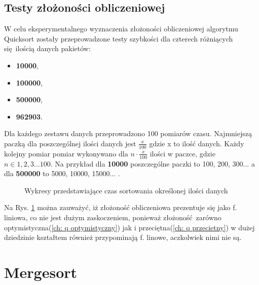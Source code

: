 \documentclass[12pt]{article}
\begin{document}
\subsection{Testy złożoności obliczeniowej}
W celu eksperymentalnego wyznaczenia złożoności obliczeniowej algorytmu Quicksort zostały przeprowadzone testy szybkości dla 
czterech różniących się ilością danych pakietów: 
\begin{itemize}
       \item \textbf{10000},
       \item  \textbf{100000},
       \item \textbf{500000},
       \item \textbf{962903}.
\end{itemize}
Dla każdego zestawu danych przeprowadzono 100 pomiarów czasu. Najmniejszą paczką dla poszczególnej ilości danych jest 
$\frac{x}{100}$ gdzie x to ilość danych. Każdy kolejny pomiar pomiar wykonywano dla $n \cdot \frac{x}{100}$ ilości w paczce,
gdzie $n \in 1,2,3 ... 100$.
Na przykład dla \textbf{10000} poszczególne paczki to 100, 200, 300... a dla \textbf{500000} to 5000, 10000, 15000... .

\begin{figure}[H]
       \centering
       \quad
\end{figure}
\begin{figure}[H]\ContinuedFloat
       \centering
       
       \quad
       \renewcommand{\figurename}{Wykres.}

       \caption{Wykresy przedstawiające czas sortowania określonej ilości danych}
       \label{fig: qsort}
\end{figure}

Na Rys. \ref{fig: qsort} można zauważyć, iż złożoność obliczeniowa prezentuje się jako f. liniowa,
co nie jest dużym zaskoczeniem, ponieważ złożoność zarówno optymistyczna(\ref{ch: q optymistyczny}) jak i przeciętna(\ref{ch: q przecietny}) w dużej dziedzinie kształtem 
również przypominają f. linowe, aczkolwiek nimi nie są.

\section{Mergesort}\label{ch: mergesort}
\end{document}
